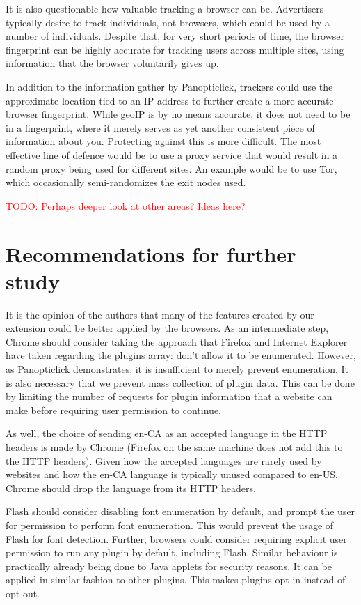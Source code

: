 \documentclass[12pt,a4paper]{article}
\begin{document}
It is also questionable how valuable tracking a browser can be. Advertisers typically desire to track individuals, not browsers, which could be used by a number of individuals. Despite that, for very short periods of time, the browser fingerprint can be highly accurate for tracking users across multiple sites, using information that the browser voluntarily gives up.

In addition to the information gather by Panopticlick, trackers could use the approximate location tied to an IP address to further create a more accurate browser fingerprint. While geoIP is by no means accurate, it does not need to be in a fingerprint, where it merely serves as yet another consistent piece of information about you. Protecting against this is more difficult. The most effective line of defence would be to use a proxy service that would result in a random proxy being used for different sites. An example would be to use Tor\cite{tor}, which occasionally semi-randomizes the exit nodes used.

\textcolor{red}{TODO: Perhaps deeper look at other areas? Ideas here?}

\section{Recommendations for further study}
It is the opinion of the authors that many of the features created by our extension could be better applied by the browsers. As an intermediate step, Chrome should consider taking the approach that Firefox and Internet Explorer have taken regarding the plugins array: don't allow it to be enumerated. However, as Panopticlick demonstrates, it is insufficient to merely prevent enumeration. It is also necessary that we prevent mass collection of plugin data. This can be done by limiting the number of requests for plugin information that a website can make before requiring user permission to continue.

As well, the choice of sending en-CA as an accepted language in the HTTP headers is made by Chrome (Firefox on the same machine does not add this to the HTTP headers). Given how the accepted languages are rarely used by websites and how the en-CA language is typically unused compared to en-US, Chrome should drop the language from its HTTP headers.

Flash should consider disabling font enumeration by default, and prompt the user for permission to perform font enumeration. This would prevent the usage of Flash for font detection. Further, browsers could consider requiring explicit user permission to run any plugin by default, including Flash. Similar behaviour is practically already being done to Java applets for security reasons. It can be applied in similar fashion to other plugins. This makes plugins opt-in instead of opt-out.
\end{document}
